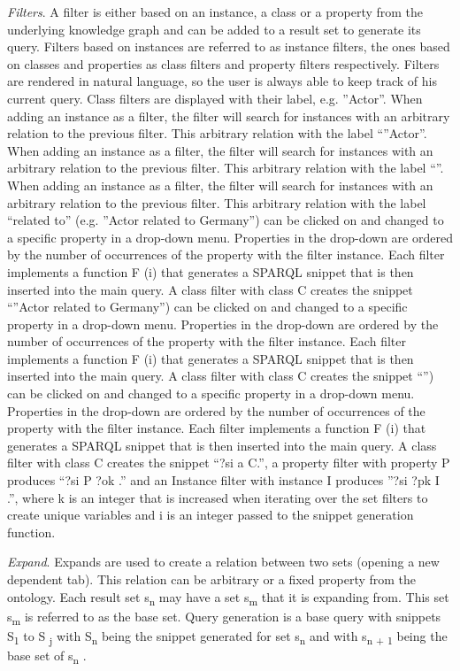 \documentclass{sig-alternate}
\begin{document}
{\em Filters}. A filter is either based on an instance, a class or a property from the underlying knowledge graph and can be added to a result set to generate its query. Filters based on instances are referred to as instance filters, the ones based on classes and properties as class filters and property filters respectively. Filters are rendered in natural language, so the user is always able to keep track of his current query. Class ﬁlters are displayed with their label, e.g. ''Actor''. When adding an instance as a ﬁlter, the ﬁlter will search for instances with an arbitrary relation to the previous ﬁlter. This arbitrary relation with the label ``''Actor''. When adding an instance as a ﬁlter, the ﬁlter will search for instances with an arbitrary relation to the previous ﬁlter. This arbitrary relation with the label ``''. When adding an instance as a ﬁlter, the ﬁlter will search for instances with an arbitrary relation to the previous ﬁlter. This arbitrary relation with the label ``related to'' (e.g. ''Actor related to Germany'') can be clicked on and changed to a speciﬁc property in a drop-down menu. Properties in the drop-down are ordered by the number of occurrences of the property with the ﬁlter instance. Each ﬁlter implements a function F (i) that generates a SPARQL snippet that is then inserted into the main query. A class ﬁlter with class C creates the snippet ``''Actor related to Germany'') can be clicked on and changed to a speciﬁc property in a drop-down menu. Properties in the drop-down are ordered by the number of occurrences of the property with the ﬁlter instance. Each ﬁlter implements a function F (i) that generates a SPARQL snippet that is then inserted into the main query. A class ﬁlter with class C creates the snippet ``'') can be clicked on and changed to a speciﬁc property in a drop-down menu. Properties in the drop-down are ordered by the number of occurrences of the property with the ﬁlter instance. Each ﬁlter implements a function F (i) that generates a SPARQL snippet that is then inserted into the main query. A class ﬁlter with class C creates the snippet ``?si a C.'', a property ﬁlter with property P produces ``?si P ?ok .'' and an Instance ﬁlter with instance I produces ''?si ?pk I .'', where k is an integer that is increased when iterating over the set ﬁlters to create unique variables and i is an integer passed to the snippet generation function.

{\em Expand}. Expands are used to create a relation between two sets (opening a new dependent tab). This relation can be arbitrary or a ﬁxed property from the ontology. Each result set s\textsubscript{n} may have a set s\textsubscript{m} that it is expanding from. This set s\textsubscript{m} is referred to as the base set. Query generation is a base query with snippets S\textsubscript{1} to S\textsubscript{ j} with S\textsubscript{n} being the snippet generated for set s\textsubscript{n} and with s\textsubscript{n + 1} being the base set of s\textsubscript{n} .
\end{document}
